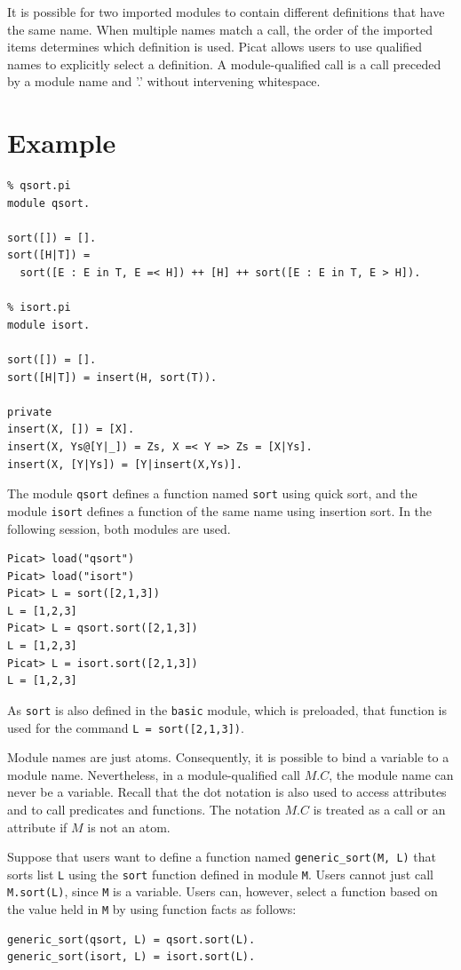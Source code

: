 It is possible for two imported modules to contain different definitions that have the same name. When multiple names match a call, the order of the imported items determines which definition is used. Picat allows users to use qualified names to explicitly select a definition. A module-qualified call is a call preceded by a module name and '.' without intervening whitespace. 

\section*{Example}
\begin{verbatim}
% qsort.pi
module qsort.

sort([]) = [].
sort([H|T]) = 
  sort([E : E in T, E =< H]) ++ [H] ++ sort([E : E in T, E > H]).

% isort.pi
module isort.

sort([]) = [].
sort([H|T]) = insert(H, sort(T)).

private
insert(X, []) = [X].
insert(X, Ys@[Y|_]) = Zs, X =< Y => Zs = [X|Ys].
insert(X, [Y|Ys]) = [Y|insert(X,Ys)].
\end{verbatim}
The module \texttt{qsort} defines a function named \texttt{sort} using quick sort, and the module \texttt{isort} defines a function of the same name using insertion sort. In the following session, both modules are used.
\begin{verbatim}
Picat> load("qsort")
Picat> load("isort")
Picat> L = sort([2,1,3])
L = [1,2,3]
Picat> L = qsort.sort([2,1,3])
L = [1,2,3]
Picat> L = isort.sort([2,1,3])
L = [1,2,3]
\end{verbatim}
As \texttt{sort} is also defined in the \texttt{basic} module, which is preloaded, that function is used for the command \texttt{L = sort([2,1,3])}.

Module names are just atoms. Consequently, it is possible to bind a variable to a module name. Nevertheless, in a module-qualified call $M.C$, the module name can never be a variable. Recall that the dot notation is also used to access attributes and to call predicates and functions. The notation $M.C$ is treated as a call or an attribute if $M$ is not an atom.

Suppose that users want to define a function named \texttt{generic\_sort(M, L)} that sorts list \texttt{L} using the \texttt{sort} function defined in module \texttt{M}. Users cannot just call \texttt{M.sort(L)}, since \texttt{M} is a variable. Users can, however, select a function based on the value held in \texttt{M} by using function facts as follows:
\begin{verbatim}
generic_sort(qsort, L) = qsort.sort(L).
generic_sort(isort, L) = isort.sort(L).
\end{verbatim}

